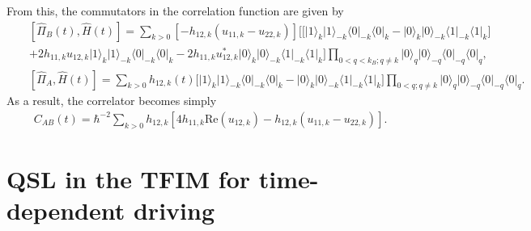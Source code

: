 \documentclass[prl,aps,amssymb,twocolumn,superscriptaddress, notitlepage, longbibliography]{revtex4-2}
\begin{document}
From this, the commutators in the correlation function are given by
\begin{eqnarray}
    &&\left[\hat\Pi_B(t),\hat H(t)\right]=\sum_{k>0}\left[-h_{12,k}\left(u_{11,k}-u_{22,k}\right)\right]\Big[\Big[\lvert1\rangle_k\lvert1\rangle_{-k}\langle0\rvert_{-k}\langle0\rvert_k-\lvert0\rangle_k\lvert0\rangle_{-k}\langle1\rvert_{-k}\langle1\rvert_k\Big]\\
    &&+2h_{11,k}u_{12,k}\lvert1\rangle_k\lvert1\rangle_{-k}\langle0\rvert_{-k}\langle0\rvert_k-2h_{11,k}u^*_{12,k}\lvert0\rangle_k\lvert0\rangle_{-k}\langle1\rvert_{-k}\langle1\rvert_k\Big]\prod_{0<q<k_B;q\neq k}\lvert 0\rangle_{q}\lvert 0\rangle_{-q}\langle 0\rvert_{-q}\langle 0\rvert_{q},\nonumber\\
    &&\left[\hat\Pi_A,\hat H(t)\right]=\sum_{k>0}h_{12,k}(t)\Big[\lvert1\rangle_k\lvert1\rangle_{-k}\langle0\rvert_{-k}\langle0\rvert_k-\lvert0\rangle_k\lvert0\rangle_{-k}\langle1\rvert_{-k}\langle1\rvert_k\Big]\prod_{0<q;q\neq k}\lvert 0\rangle_{q}\lvert 0\rangle_{-q}\langle 0\rvert_{-q}\langle 0\rvert_{q}.
\end{eqnarray}
As a result, the correlator becomes simply
\begin{eqnarray}
    C_{AB}(t)=\hbar^{-2}\sum_{k>0}h_{12,k}\left[4h_{11,k}\mathrm{Re}(u_{12,k})-h_{12,k}\left(u_{11,k}-u_{22,k}\right)\right].
\end{eqnarray}






\section{QSL in the TFIM for time-dependent driving}
\end{document}
